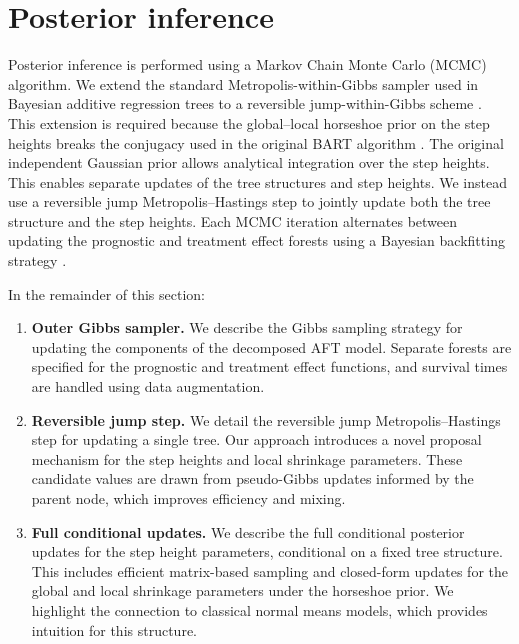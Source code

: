 \section{Posterior inference}\label{sec:sampling}

Posterior inference is performed using a Markov Chain Monte Carlo (MCMC) algorithm. 
We extend the standard Metropolis-within-Gibbs sampler used in Bayesian additive regression trees to a reversible jump-within-Gibbs scheme \citep{ReversibleJump}.
This extension is required because the global--local horseshoe prior on the step heights breaks the conjugacy used in the original BART algorithm \citep{BARToriginal}. 
The original independent Gaussian prior allows analytical integration over the step heights. 
This enables separate updates of the tree structures and step heights.
We instead use a reversible jump Metropolis--Hastings step to jointly update both the tree structure and the step heights. 
Each MCMC iteration alternates between updating the prognostic and treatment effect forests using a Bayesian backfitting strategy \citep{Backfitting}.

In the remainder of this section:

\begin{enumerate}
    \item \textbf{Outer Gibbs sampler.}  
    We describe the Gibbs sampling strategy for updating the components of the decomposed AFT model. Separate forests are specified for the prognostic and treatment effect functions, and survival times are handled using data augmentation.

    \item \textbf{Reversible jump step.}  
    We detail the reversible jump Metropolis--Hastings step for updating a single tree. Our approach introduces a novel proposal mechanism for the step heights and local shrinkage parameters. These candidate values are drawn from pseudo-Gibbs updates informed by the parent node, which improves efficiency and mixing.

    \item \textbf{Full conditional updates.}  
    We describe the full conditional posterior updates for the step height parameters, conditional on a fixed tree structure. This includes efficient matrix-based sampling and closed-form updates for the global and local shrinkage parameters under the horseshoe prior. We highlight the connection to classical normal means models, which provides intuition for this structure.
\end{enumerate}

